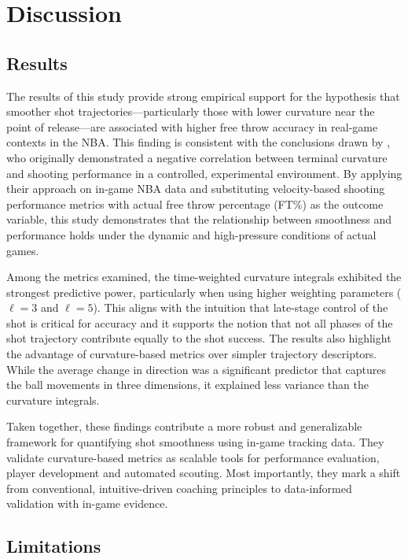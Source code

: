\documentclass{article}
\begin{document}
\section{Discussion}

    \subsection{Results}
      
        The results of this study provide strong empirical support for the hypothesis that smoother shot trajectories---particularly those with lower curvature near the point of release---are associated with higher free throw accuracy in real-game contexts in the NBA. This finding is consistent with the conclusions drawn by \citet{slegers_role_2024}, who originally demonstrated a negative correlation between terminal curvature and shooting performance in a controlled, experimental environment. By applying their approach on in-game NBA data and substituting velocity-based shooting performance metrics with actual free throw percentage (FT\%) as the outcome variable, this study demonstrates that the relationship between smoothness and performance holds under the dynamic and high-pressure conditions of actual games.

        Among the metrics examined, the time-weighted curvature integrals exhibited the strongest predictive power, particularly when using higher weighting parameters (\(\ell=3\) and \(\ell=5\)). This aligns with the intuition that late-stage control of the shot is critical for accuracy and it supports the notion that not all phases of the shot trajectory contribute equally to the shot success. The results also highlight the advantage of curvature-based metrics over simpler trajectory descriptors. While the average change in direction was a significant predictor that captures the ball movements in three dimensions, it explained less variance than the curvature integrals.
        
        Taken together, these findings contribute a more robust and generalizable framework for quantifying shot smoothness using in-game tracking data. They validate curvature-based metrics as scalable tools for performance evaluation, player development and automated scouting. Most importantly, they mark a shift from conventional, intuitive-driven coaching principles to data-informed validation with in-game evidence.

    \subsection{Limitations}
\end{document}
